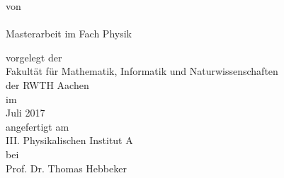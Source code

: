 
\makeatletter
\begin{titlepage}
		\tgherosfont
		\centering
		
		\Large
		
		\vspace*{\fill}
		
		{
            \color{ctcolormain}
            \fontsize{30}{32}\selectfont
            \bfseries
            \@title
            \par
		}
		
		\vspace{24mm}
		
		\textsf{von} \\
		{\LARGE \@author} \\[32mm]
		
		Masterarbeit im Fach Physik \\[8mm]
		
		\large
		
		\textsf{vorgelegt der} \\
		Fakultät für Mathematik, Informatik und Naturwissenschaften \\der RWTH Aachen \\[8mm]
		
		\textsf{im} \\
		Juli 2017 \\[8mm]
		
		\textsf{angefertigt am} \\
		III. Physikalischen Institut A \\[8mm]
		
		\textsf{bei} \\
		Prof. Dr. Thomas Hebbeker \\
\end{titlepage}
\makeatother